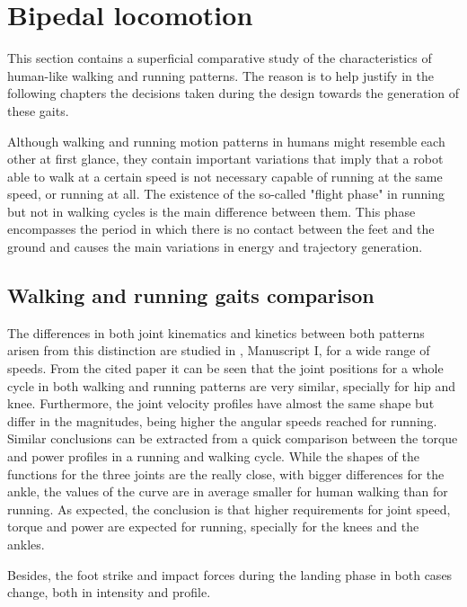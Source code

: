 
\section{Bipedal locomotion} %
\label{sec:bipedal_walking_and_running_gaits}
This section contains a superficial comparative study of the characteristics of human-like walking and running patterns.
The reason is to help justify in the following chapters the decisions taken during the design towards the generation of these gaits.

Although walking and running motion patterns in humans might resemble each other at first glance, they contain important variations that imply that a robot able to walk at a certain speed is not necessary capable of running at the same speed, or running at all.
The existence of the so-called "flight phase" in running but not in walking cycles is the main difference between them.
This phase encompasses the period in which there is no contact between the feet and the ground and causes the main variations in energy and trajectory generation.

\subsection{Walking and running gaits comparison} %
\label{sub:walk_and_run_comparison}
The differences in both joint kinematics and kinetics between both patterns arisen from this distinction are studied in \cite{grimmer}, Manuscript I, for a wide range of speeds.
From the cited paper it can be seen that the joint positions for a whole cycle in both walking and running patterns are very similar, specially for hip and knee.
Furthermore, the joint velocity profiles have almost the same shape but differ in the magnitudes, being higher the angular speeds reached for running.
Similar conclusions can be extracted from a quick comparison between the torque and power profiles in a running and walking cycle.
While the shapes of the functions for the three joints are the really close, with bigger differences for the ankle, the values of the curve are in average smaller for human walking than for running.
As expected, the conclusion is that higher requirements for joint speed, torque and power are expected for running, specially for the knees and the ankles.

Besides, the foot strike and impact forces during the landing phase in both cases change, both in intensity and profile.

